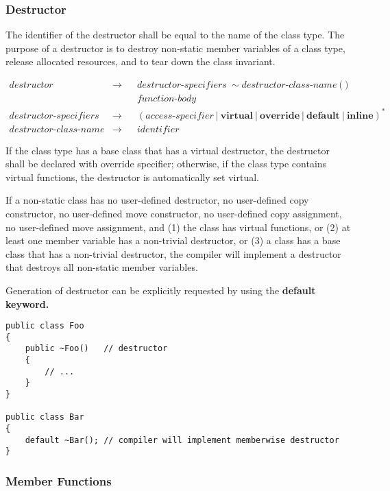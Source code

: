 \documentclass[a4paper,oneside,11pt]{article}
\begin{document}
\subsubsection{Destructor}\label{destructor}

The identifier of the destructor shall be equal to the name of the class type.
The purpose of a destructor is to destroy non-static member variables of a class type, release allocated resources,
and to tear down the class invariant.

\begin{align*}
destructor &\rightarrow & &destructor\textrm{-}specifiers \> \sim{}destructor\textrm{-}class\textrm{-}name \> \texttt{(} \> \texttt{)}\\
& & &\hyperref[functionbody]{function\textrm{-}body}\\
destructor\textrm{-}specifiers &\rightarrow & &(\hyperref[accessspecifier]{access\textrm{-}specifier} \> | \> \textbf{virtual} \> | \>
\textbf{override} \> | \> \textbf{default} \> | \> \textbf{inline})^*\\
destructor\textrm{-}class\textrm{-}name &\rightarrow & &\hyperref[identifier]{identifier}
\end{align*}

If the class type has a base class that has a virtual destructor, the destructor shall be declared with override specifier;
otherwise, if the class type contains virtual functions, the destructor is automatically set virtual.

If a non-static class has no user-defined destructor,
no user-defined copy constructor, no user-defined move constructor, no user-defined copy assignment, no user-defined move assignment, and
(1) the class has virtual functions,
or (2) at least one member variable has a non-trivial destructor,
or (3) a class has a base class that has a non-trivial destructor,
the compiler will implement a destructor that destroys all non-static member variables.

Generation of destructor can be explicitly requested by using the \bf{default} keyword.

\begin{lstlisting}[frame=trBL]
public class Foo
{
    public ~Foo()   // destructor
    {
        // ...
    }
}

public class Bar
{
    default ~Bar(); // compiler will implement memberwise destructor
}
\end{lstlisting}

\subsubsection{Member Functions}\label{memberfunction}
\end{document}
